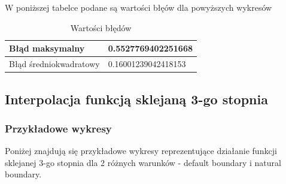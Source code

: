 \documentclass{article}
\begin{document}
\noindent
W poniższej tabelce podane są wartości błęów dla powyższych wykresów

\begin{table}[!ht]
    \centering
    \begin{tabular}{|l|l|}
    \hline
        Błąd maksymalny & 0.5527769402251668 \\ \hline
        Błąd średniokwadratowy & 0.16001239042418153 \\ \hline
    \end{tabular}
    \caption{Wartości błędów}
\end{table}

\subsection{Interpolacja funkcją sklejaną 3-go stopnia}

\subsubsection{Przykładowe wykresy}

\noindent
Poniżej znajdują się przykładowe wykresy reprezentujące działanie funkcji sklejanej 3-go stopnia dla 2 różnych warunków - default boundary i natural boundary.
\end{document}
